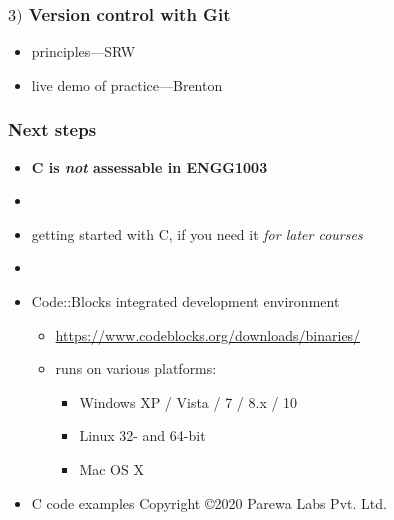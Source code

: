 \documentclass[english,14pt]{beamer}
\begin{document}

\begin{frame}[fragile]

\frametitle{$3)$ Version control with Git}

\begin{itemize}
	\item principles---SRW
	\item live demo of practice---Brenton
\end{itemize}

\end{frame}


\begin{frame}[fragile]

\frametitle{Next steps}
\begin{itemize}
	\item[]\textbf{C is \emph{not} assessable in ENGG1003}
	\item[]
	\item getting started with C, if you need it \emph{for later courses}		
	\item[]
	\item Code::Blocks integrated development environment
	\begin{itemize}
		\item \href{https://www.codeblocks.org/downloads/binaries/}{https://www.codeblocks.org/downloads/binaries/}
		\item runs on various platforms:
		\begin{itemize}
			\item Windows XP / Vista / 7 / 8.x / 10
			\item Linux 32- and 64-bit
			\item Mac OS X
		\end{itemize}
	\end{itemize}
	\item[] {\tiny C code examples Copyright \copyright 2020 Parewa Labs Pvt. Ltd.}
\end{itemize}
	
\end{frame}
\end{document}
